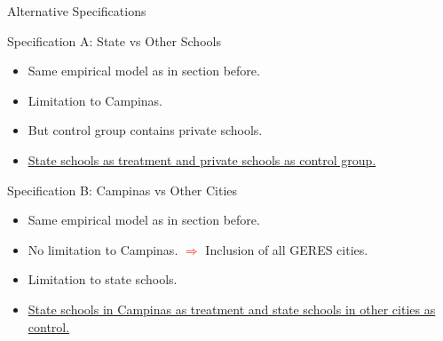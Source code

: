 \documentclass{beamer}
\begin{document}
\begin{frame} {Alternative Specifications}
\begin{block}{\centering \Large Specification A: State vs Other Schools}
\begin{itemize}
\item [\sbt] \scriptsize Same empirical model as in section before.
\item [\sbt] \scriptsize Limitation to Campinas.
\item [\sbt] \scriptsize But control group contains private schools.
\item [\sbt] \scriptsize \underline{State schools as treatment and private schools as control group.}
\end{itemize}
\end{block}

\vspace{0.7cm}
\begin{block}{\centering \Large Specification B: Campinas vs Other Cities}
\begin{itemize}
\item [\sbt] \scriptsize Same empirical model as in section before.
\item [\sbt] \scriptsize No limitation to Campinas. \textcolor{red}{$\Longrightarrow$} Inclusion of all GERES cities.
\item [\sbt] \scriptsize Limitation to state schools.
\item [\sbt] \scriptsize \underline{State schools in Campinas as treatment and state schools in other cities as control.} 
\end{itemize}
\end{block}  
\end{frame}
\end{document}
